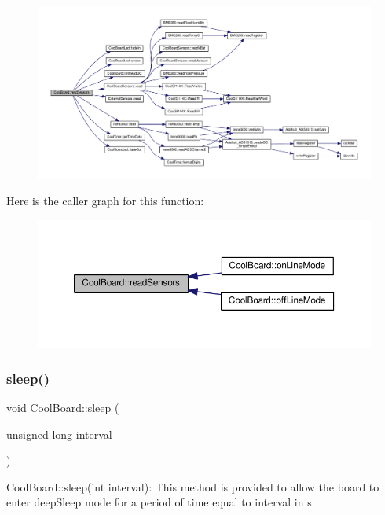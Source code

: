 \begin{figure}[H]
\begin{center}
\leavevmode
\includegraphics[width=350pt]{d7/df9/class_cool_board_ad03abdce2e65f520bbf2cff0f2d083cf_cgraph}
\end{center}
\end{figure}
Here is the caller graph for this function\+:\nopagebreak
\begin{figure}[H]
\begin{center}
\leavevmode
\includegraphics[width=350pt]{d7/df9/class_cool_board_ad03abdce2e65f520bbf2cff0f2d083cf_icgraph}
\end{center}
\end{figure}
\mbox{\label{class_cool_board_a069952cdcb2e7f68518aa429eceadb6e}} 
\subsubsection{\texorpdfstring{sleep()}{sleep()}}
{\footnotesize\ttfamily void Cool\+Board\+::sleep (\begin{DoxyParamCaption}\item[{unsigned long}]{interval }\end{DoxyParamCaption})}

Cool\+Board\+::sleep(int interval)\+: This method is provided to allow the board to enter deep\+Sleep mode for a period of time equal to interval in s 

